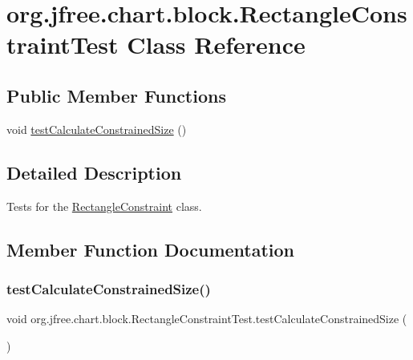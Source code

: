 \hypertarget{classorg_1_1jfree_1_1chart_1_1block_1_1_rectangle_constraint_test}{}\section{org.\+jfree.\+chart.\+block.\+Rectangle\+Constraint\+Test Class Reference}
\label{classorg_1_1jfree_1_1chart_1_1block_1_1_rectangle_constraint_test}
\subsection*{Public Member Functions}
\begin{DoxyCompactItemize}
\item 
void \mbox{\hyperlink{classorg_1_1jfree_1_1chart_1_1block_1_1_rectangle_constraint_test_ac85ba94d29687f9d2670eca523822edf}{test\+Calculate\+Constrained\+Size}} ()
\end{DoxyCompactItemize}


\subsection{Detailed Description}
Tests for the \mbox{\hyperlink{classorg_1_1jfree_1_1chart_1_1block_1_1_rectangle_constraint}{Rectangle\+Constraint}} class. 

\subsection{Member Function Documentation}
\mbox{\label{classorg_1_1jfree_1_1chart_1_1block_1_1_rectangle_constraint_test_ac85ba94d29687f9d2670eca523822edf}} 
\subsubsection{\texorpdfstring{test\+Calculate\+Constrained\+Size()}{testCalculateConstrainedSize()}}
{\footnotesize\ttfamily void org.\+jfree.\+chart.\+block.\+Rectangle\+Constraint\+Test.\+test\+Calculate\+Constrained\+Size (\begin{DoxyParamCaption}{ }\end{DoxyParamCaption})}

